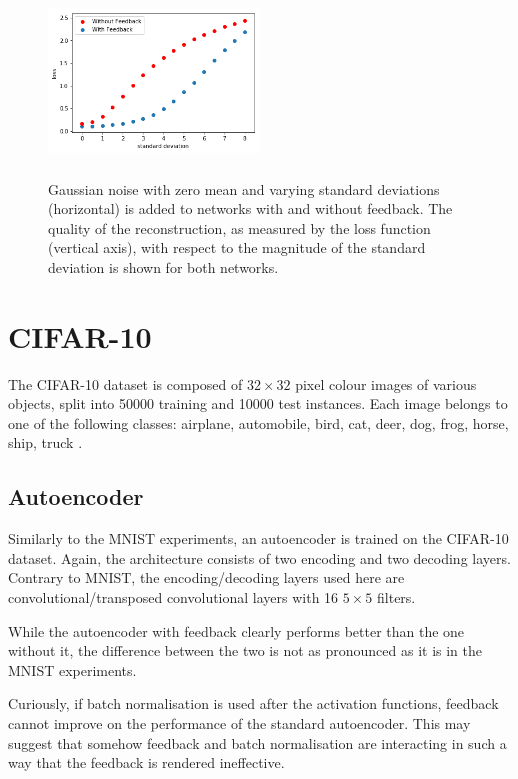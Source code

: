 \documentclass{article}
\begin{document}
  \begin{figure}
      \centering
      \includegraphics[width=0.5\textwidth,height=5cm,keepaspectratio]{img/actnoise_varstd.png}
      \caption{Gaussian noise with zero mean and varying standard deviations (horizontal) is added to networks with and without feedback. The quality of the reconstruction, as measured by the loss function (vertical axis), with respect to the magnitude of the standard deviation is shown for both networks. }
      \label{fig:noiseact}
  \end{figure}

  
\section{CIFAR-10}
The CIFAR-10 dataset is composed of $32\times32$ pixel colour images of various objects, split into 50000 training and 10000 test instances. Each image belongs to one of the following classes: airplane, automobile, bird, cat, deer, dog, frog, horse, ship, truck \cite{krizhevsky2014cifar}. 

\subsection{Autoencoder}
\label{cifarae}
Similarly to the MNIST experiments, an autoencoder is trained on the CIFAR-10 dataset. Again, the architecture consists of two encoding and two decoding layers. Contrary to MNIST, the encoding/decoding layers used here are convolutional/transposed convolutional layers with 16 $5 \times 5$ filters. 

While the autoencoder with feedback clearly performs better than the one without it, the difference between the two is not as pronounced as it is in the MNIST experiments.   

Curiously, if batch normalisation \cite{ioffe2015batch} is used after the activation functions, feedback cannot improve on the performance of the standard autoencoder. This may suggest that somehow feedback and batch normalisation are interacting in such a way that the feedback is rendered ineffective. 
\end{document}
